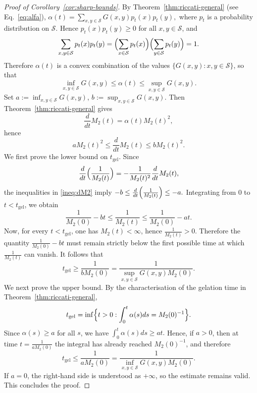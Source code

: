 \documentclass[10pt,a4paper]{amsart}
\begin{document}
\begin{proof}[Proof of Corollary~\ref{cor:sharp-bounds}]
By Theorem~\ref{thm:riccati-general} (see Eq.~\eqref{eq:alfa}),
$
\alpha(t)=\sum_{x,y\in\mathcal S} G(x,y)p_t(x)p_t(y),
$
where $p_t$ is a probability distribution on $\mathcal S$. Hence
$p_t(x)p_t(y)\ge 0$ for all $x,y\in\mathcal S$, and
$$
\sum_{x,y\in\mathcal S} p_t(x)p_t(y)
=
\Bigl(\sum_{x\in\mathcal S} p_t(x)\Bigr)
\Bigl(\sum_{y\in\mathcal S} p_t(y)\Bigr)
=1.
$$
Therefore $\alpha(t)$ is a convex combination of the values
$\{G(x,y):x,y\in\mathcal S\}$, so that
$$
\inf_{x,y\in\mathcal S} G(x,y)
\le
\alpha(t)
\le
\sup_{x,y\in\mathcal S} G(x,y).
$$
Set
$
a:=\inf_{x,y\in\mathcal S} G(x,y)$,
$
b:=\sup_{x,y\in\mathcal S} G(x,y).
$
Then Theorem~\ref{thm:riccati-general} gives
$$
\frac{d}{dt}M_2(t)=\alpha(t)M_2(t)^2,
$$
hence
\begin{equation}\label{ineq:dM2}
aM_2(t)^2
\le
\frac{d}{dt}M_2(t)
\le
bM_2(t)^2.
\end{equation}
We first prove the lower bound on $t_{\mathrm{gel}}$. Since
$$
\frac{d}{dt}\Bigl(\frac{1}{M_2(t)}\Bigr)
=
-\frac{1}{M_2(t)^2}\frac{d}{dt}M_2(t),
$$
the inequalities in \eqref{ineq:dM2} imply
$
-b
\le
\frac{d}{dt}\Bigl(\frac{1}{M_2(t)}\Bigr)
\le
-a.
$
Integrating from $0$ to $t<t_{\mathrm{gel}}$, we obtain
$$
\frac{1}{M_2(0)}-bt
\le
\frac{1}{M_2(t)}
\le
\frac{1}{M_2(0)}-at.
$$
Now, for every $t<t_{\mathrm{gel}}$, one has $M_2(t)<\infty$, hence
$\frac1{M_2(t)}>0$. Therefore the quantity
$\frac{1}{M_2(0)}-bt$ must remain strictly below the first possible time at which
$\frac1{M_2(t)}$ can vanish. It follows that
$$
t_{\mathrm{gel}}
\ge
\frac{1}{bM_2(0)}
=
\frac{1}{\sup_{x,y\in\mathcal S} G(x,y)M_2(0)}.
$$
We next prove the upper bound. By the characterisation of the gelation time in
Theorem~\ref{thm:riccati-general},
$$
t_{\mathrm{gel}}
=
\inf
\Bigl\{
t>0:\int_0^t \alpha(s)ds=M_2(0)^{-1}
\Bigr\}.
$$
Since $\alpha(s)\ge a$ for all $s$, we have
$
\int_0^t \alpha(s)ds \geq at.
$
Hence, if $a>0$, then at time
$
t=\frac{1}{aM_2(0)}
$
the integral has already reached $M_2(0)^{-1}$, and therefore
$$
t_{\mathrm{gel}}
\le
\frac{1}{aM_2(0)}
=
\frac{1}{\inf_{x,y\in\mathcal S} G(x,y)M_2(0)}.
$$
If $a=0$, the right-hand side is understood as $+\infty$, so the estimate remains valid. This concludes the proof.
\end{proof}
\end{document}
